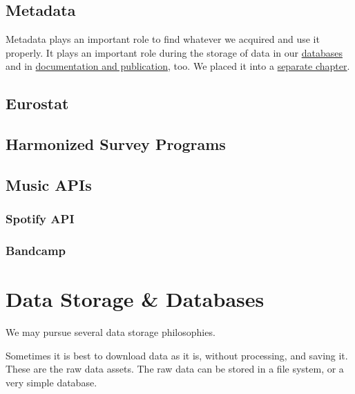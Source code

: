 \documentclass[
  fontsize=13pt,
  english,
  a4paper,
  openany, a4paper, oneside]{book}
\begin{document}
\hypertarget{collect-metadata}{%
\section{Metadata}\label{collect-metadata}}

Metadata plays an important role to find whatever we acquired and use it properly. It plays an important role during the storage of data in our \protect\hyperlink{data-storage}{databases} and in \protect\hyperlink{documentation}{documentation and publication}, too. We placed it into a \protect\hyperlink{metadata}{separate chapter}.

\hypertarget{eurostat}{%
\section{Eurostat}\label{eurostat}}

\hypertarget{harmonized-survey-programs}{%
\section{Harmonized Survey Programs}\label{harmonized-survey-programs}}

\hypertarget{music-apis}{%
\section{Music APIs}\label{music-apis}}

\hypertarget{spotify-api}{%
\subsection{Spotify API}\label{spotify-api}}

\hypertarget{bandcamp}{%
\subsection{Bandcamp}\label{bandcamp}}

\hypertarget{data-storage}{%
\chapter{Data Storage \& Databases}\label{data-storage}}

We may pursue several data storage philosophies.

Sometimes it is best to download data as it is, without processing, and saving it. These are the raw data assets. The raw data can be stored in a file system, or a very simple database.
\end{document}
